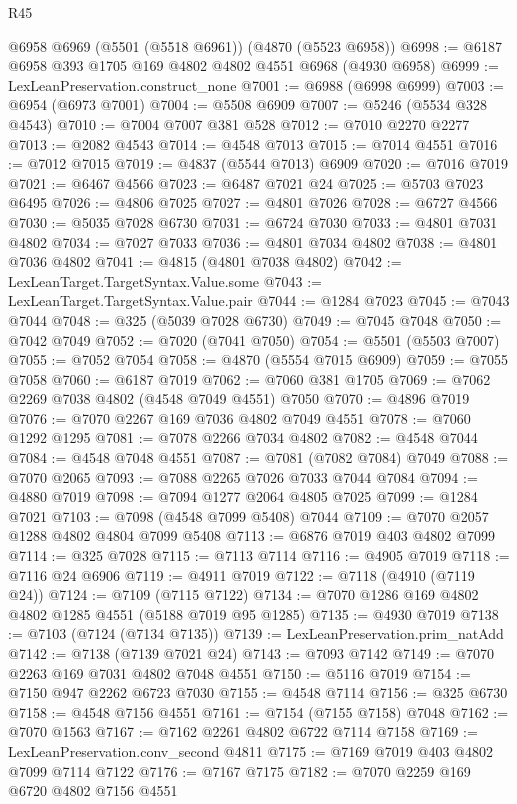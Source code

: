 \begin{lexlean}{R45}
\begin{coremodule}
    @6958
    @6969
    (@5501 (@5518 @6961))
    (@4870 (@5523 @6958))
@6998 := @6187 @6958 @393 @1705 @169 @4802 @4802 @4551 @6968 (@4930 @6958)
@6999 := LexLeanPreservation.construct_none
@7001 := @6988 (@6998 @6999)
@7003 := @6954 (@6973 @7001)
@7004 := @5508 @6909
@7007 := @5246 (@5534 @328 @4543)
@7010 := @7004 @7007 @381 @528
@7012 := @7010 @2270 @2277
@7013 := @2082 @4543
@7014 := @4548 @7013
@7015 := @7014 @4551
@7016 := @7012 @7015
@7019 := @4837 (@5544 @7013) @6909
@7020 := @7016 @7019
@7021 := @6467 @4566
@7023 := @6487 @7021 @24
@7025 := @5703 @7023 @6495
@7026 := @4806 @7025
@7027 := @4801 @7026
@7028 := @6727 @4566
@7030 := @5035 @7028 @6730
@7031 := @6724 @7030
@7033 := @4801 @7031 @4802
@7034 := @7027 @7033
@7036 := @4801 @7034 @4802
@7038 := @4801 @7036 @4802
@7041 := @4815 (@4801 @7038 @4802)
@7042 := LexLeanTarget.TargetSyntax.Value.some
@7043 := LexLeanTarget.TargetSyntax.Value.pair
@7044 := @1284 @7023
@7045 := @7043 @7044
@7048 := @325 (@5039 @7028 @6730)
@7049 := @7045 @7048
@7050 := @7042 @7049
@7052 := @7020 (@7041 @7050)
@7054 := @5501 (@5503 @7007)
@7055 := @7052 @7054
@7058 := @4870 (@5554 @7015 @6909)
@7059 := @7055 @7058
@7060 := @6187 @7019
@7062 := @7060 @381 @1705
@7069 := @7062 @2269 @7038 @4802 (@4548 @7049 @4551) @7050
@7070 := @4896 @7019
@7076 := @7070 @2267 @169 @7036 @4802 @7049 @4551
@7078 := @7060 @1292 @1295
@7081 := @7078 @2266 @7034 @4802
@7082 := @4548 @7044
@7084 := @4548 @7048 @4551
@7087 := @7081 (@7082 @7084) @7049
@7088 := @7070 @2065
@7093 := @7088 @2265 @7026 @7033 @7044 @7084
@7094 := @4880 @7019
@7098 := @7094 @1277 @2064 @4805 @7025
@7099 := @1284 @7021
@7103 := @7098 (@4548 @7099 @5408) @7044
@7109 := @7070 @2057 @1288 @4802 @4804 @7099 @5408
@7113 := @6876 @7019 @403 @4802 @7099
@7114 := @325 @7028
@7115 := @7113 @7114
@7116 := @4905 @7019
@7118 := @7116 @24 @6906
@7119 := @4911 @7019
@7122 := @7118 (@4910 (@7119 @24))
@7124 := @7109 (@7115 @7122)
@7134 := @7070 @1286 @169 @4802 @4802 @1285 @4551 (@5188 @7019 @95 @1285)
@7135 := @4930 @7019
@7138 := @7103 (@7124 (@7134 @7135))
@7139 := LexLeanPreservation.prim_natAdd
@7142 := @7138 (@7139 @7021 @24)
@7143 := @7093 @7142
@7149 := @7070 @2263 @169 @7031 @4802 @7048 @4551
@7150 := @5116 @7019
@7154 := @7150 @947 @2262 @6723 @7030
@7155 := @4548 @7114
@7156 := @325 @6730
@7158 := @4548 @7156 @4551
@7161 := @7154 (@7155 @7158) @7048
@7162 := @7070 @1563
@7167 := @7162 @2261 @4802 @6722 @7114 @7158
@7169 := LexLeanPreservation.conv_second @4811
@7175 := @7169 @7019 @403 @4802 @7099 @7114 @7122
@7176 := @7167 @7175
@7182 := @7070 @2259 @169 @6720 @4802 @7156 @4551

\end{coremodule}
\end{lexlean}
